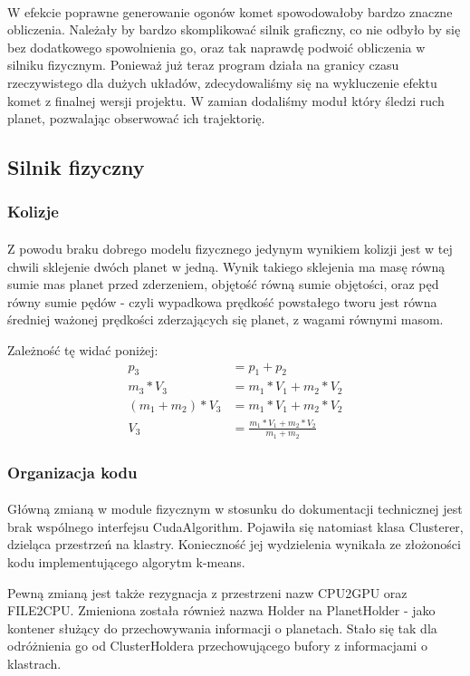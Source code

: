 \paragraph{}

W efekcie poprawne generowanie ogonów komet spowodowałoby bardzo znaczne obliczenia. Należały by bardzo skomplikować silnik graficzny, co nie odbyło by się bez dodatkowego spowolnienia go, oraz tak naprawdę podwoić obliczenia w silniku fizycznym. Ponieważ już teraz program działa na granicy czasu rzeczywistego dla dużych układów, zdecydowaliśmy się na wykluczenie efektu komet z finalnej wersji projektu. W zamian dodaliśmy moduł który śledzi ruch planet, pozwalając obserwować ich trajektorię.

\subsection{Silnik fizyczny}\label{sub:silnik fizyczny}
\subsubsection{Kolizje}
\paragraph{}

Z powodu braku dobrego modelu fizycznego jedynym wynikiem kolizji jest w tej chwili sklejenie dwóch planet w jedną. Wynik takiego sklejenia ma masę równą sumie mas planet przed zderzeniem, objętość równą sumie objętości, oraz pęd równy sumie pędów - czyli wypadkowa prędkość powstałego tworu jest równa średniej ważonej prędkości zderzających się planet, z wagami równymi masom.

Zależność tę widać poniżej:
\begin{align}
p_3 & = p_1 + p_2 \\
m_3 * V_3 & = m_1 * V_1 + m_2 * V_2 \\
( m_1 + m_2 ) * V_3 & = m_1 * V_1 + m_2 * V_2 \\
V_3 & = \frac{ m_1 * V_1 + m_2 * V_2 }{ m_1 + m_2 }
\end{align}

\subsubsection{Organizacja kodu}

\paragraph{}

Główną zmianą w module fizycznym w stosunku do dokumentacji technicznej jest brak wspólnego interfejsu CudaAlgorithm. Pojawiła się natomiast klasa Clusterer, dzieląca przestrzeń na klastry. Konieczność jej wydzielenia wynikała ze złożoności kodu implementującego algorytm k-means.

Pewną zmianą jest także rezygnacja z przestrzeni nazw CPU2GPU oraz FILE2CPU. Zmieniona została również nazwa Holder na PlanetHolder - jako kontener służący do przechowywania informacji o planetach. Stało się tak dla odróżnienia go od ClusterHoldera przechowującego bufory z informacjami o klastrach.



